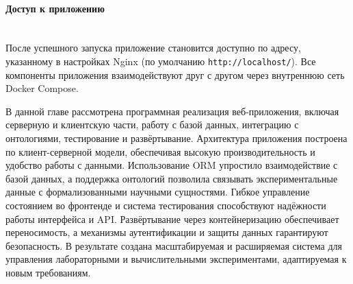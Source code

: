 \paragraph{Доступ к приложению} \mbox{}\\

После успешного запуска приложение становится доступно по адресу, указанному в настройках Nginx (по умолчанию \texttt{http://localhost/}).
Все компоненты приложения взаимодействуют друг с другом через внутреннюю сеть Docker Compose.


В данной главе рассмотрена программная реализация веб-приложения, включая серверную и клиентскую части, работу с базой данных, интеграцию с онтологиями, тестирование и развёртывание. Архитектура приложения построена по клиент-серверной модели, обеспечивая высокую производительность и удобство работы с данными. Использование ORM упростило взаимодействие с базой данных, а поддержка онтологий позволила связывать экспериментальные данные с формализованными научными сущностями. Гибкое управление состоянием во фронтенде и система тестирования способствуют надёжности работы интерфейса и API. Развёртывание через контейнеризацию обеспечивает переносимость, а механизмы аутентификации и защиты данных гарантируют безопасность. В результате создана масштабируемая и расширяемая система для управления лабораторными и вычислительными экспериментами, адаптируемая к новым требованиям.